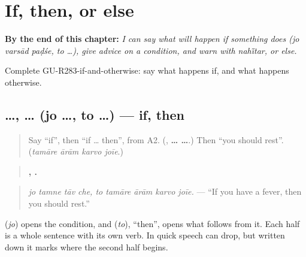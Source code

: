 
\chapter{If, then, or else}
\label{ch:gu-if-then-or-else}

\begin{chapteropening}
\textbf{By the end of this chapter:} \emph{I can say what will happen if something does (jo varsād paḍśe, to …), give advice on a condition, and warn with nahī̃tar, or else.}

Complete GU-R283-if-and-otherwise: say what happens if, and what happens otherwise.
\end{chapteropening}

\section[\texorpdfstring{\gu{જો} \gu{તમને} \gu{તાવ} \gu{છે}, \gu{તો} … (jo tamne tāv …)}{જો તમને તાવ છે, તો … (jo tamne tāv …)}]{ …,  … (jo …, to …) — if, then}

\label{lesson:GU-C283-jo-to}



\begin{quote}
Say \textquotedblleft{}if\textquotedblright{}, then \textquotedblleft{}if … then\textquotedblright{}, from A2. (\textbf{}, \textbf{ …  …}.) Then \textquotedblleft{}you should rest\textquotedblright{}. (\emph{tamāre ārām karvo joīe}.)
\end{quote}

\begin{grammarlens}[title={Grammar Lens: two halves}]
\begin{quote}
\textbf{   ,     .}
\end{quote}

\begin{quote}
\emph{jo tamne tāv che, to tamāre ārām karvo joīe.} — \textquotedblleft{}If you have a fever, then you should rest.\textquotedblright{}
\end{quote}

\textbf{} (\emph{jo}) opens the condition, and \textbf{} (\emph{to}), \textquotedblleft{}then\textquotedblright{}, opens what follows from it. Each half is a whole sentence with its own verb. In quick speech \textbf{} can drop, but written down it marks where the second half begins.
\end{grammarlens}

